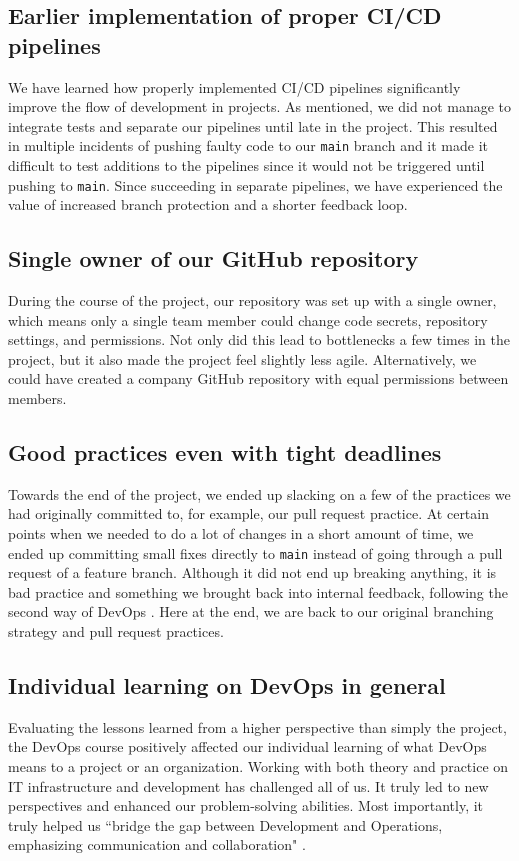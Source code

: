 \subsection{Earlier implementation of proper CI/CD pipelines}
We have learned how properly implemented CI/CD pipelines significantly improve the flow of development in projects. As mentioned, 
we did not manage to integrate tests and separate our pipelines until late in the project. This resulted in multiple incidents of pushing faulty code to our \texttt{main} branch and it made it difficult to test additions to the pipelines since it would not be triggered until pushing to \texttt{main}. Since succeeding in separate pipelines, we have experienced the value of increased branch protection and a shorter feedback loop.  

\subsection{Single owner of our GitHub repository}
During the course of the project, our repository was set up with a single owner, which means only a single team member could change code secrets, repository settings, and permissions. Not only did this lead to bottlenecks a few times in the project, but it also made the project feel slightly less agile. Alternatively, we could have created a company GitHub repository with equal permissions between members. 

\subsection{Good practices even with tight deadlines}
Towards the end of the project, we ended up slacking on a few of the practices we had originally committed to, for example, our pull request practice. At certain points when we needed to do a lot of changes in a short amount of time, we ended up committing small fixes directly to \texttt{main} instead of going through a pull request of a feature branch. Although it did not end up breaking anything, it is bad practice and something we brought back into internal feedback, following the second way of DevOps \cite{kim2021devops}. Here at the end, we are back to our original branching strategy and pull request practices. 

\subsection{Individual learning on DevOps in general}
Evaluating the lessons learned from a higher perspective than simply the project, the DevOps course positively affected our individual learning of what DevOps means to a project or an organization. Working with both theory and practice on IT infrastructure and development has challenged all of us. It truly led to new perspectives and enhanced our problem-solving abilities. Most importantly, it truly helped us “bridge the gap between Development and Operations, emphasizing communication and collaboration" \cite{jabbari2016devops}. 


